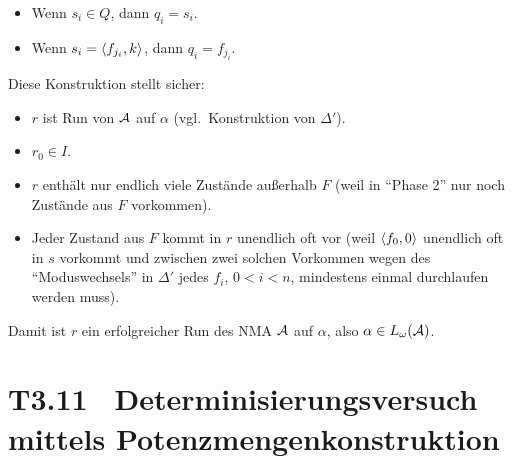 \documentclass[fontsize=11pt, twoside=false, numbers=autoenddot]{scrbook}
\begin{document}
\begin{description}
    \goodbreak
    \begin{itemize}
      \item
        Wenn $s_i \in Q$, dann $q_i = s_i$.
      \item
        Wenn $s_i = \langle f_{j_i},k\rangle$, dann $q_i = f_{j_i}$.
    \end{itemize}
    Diese Konstruktion stellt sicher:
    \begin{itemize}
      \item
        $r$ ist Run von $\mathcal{A}$ auf $\alpha$ (vgl.\ Konstruktion von $\Delta'$).
      \item
        $r_0 \in I$.
      \item
        $r$ enthält nur endlich viele Zustände außerhalb $F$ (weil in "`Phase 2"' nur noch Zustände aus $F$ vorkommen).
      \item 
        Jeder Zustand aus $F$ kommt in $r$ unendlich oft vor (weil $\langle f_0,0\rangle$ unendlich oft in $s$ vorkommt und zwischen zwei solchen Vorkommen wegen des "`Moduswechsels"' in $\Delta'$ jedes $f_i$, $0 < i < n$, mindestens einmal durchlaufen werden muss).
    \end{itemize}
    Damit ist $r$ ein erfolgreicher Run des NMA $\mathcal{A}$ auf $\alpha$,
    also $\alpha \in L_\omega(\mathcal{A})$.
    \qedhere
\end{description}

\section*{T3.11~ Determinisierungsversuch mittels Potenzmengenkonstruktion}
\end{document}
